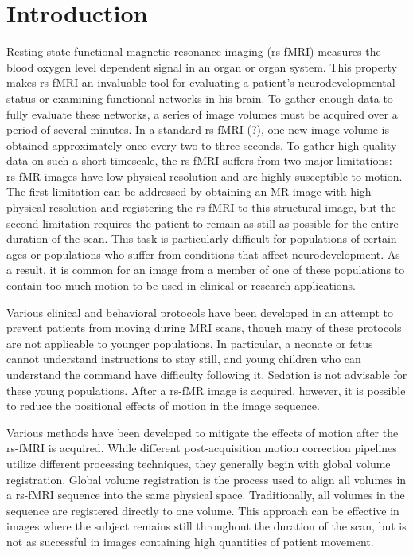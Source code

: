 \chapter{Introduction}

Resting-state functional magnetic resonance imaging (rs-fMRI) measures the blood oxygen level dependent signal in an organ or organ system. This property makes rs-fMRI an invaluable tool for evaluating a patient's neurodevelopmental status or examining functional networks in his brain. To gather enough data to fully evaluate these networks, a series of image volumes must be acquired over a period of several minutes. In a standard rs-fMRI (?), one new image volume is obtained approximately once every two to three seconds. To gather high quality data on such a short timescale, the rs-fMRI suffers from two major limitations: rs-fMR images have low physical resolution and are highly susceptible to motion. The first limitation can be addressed by obtaining an MR image with high physical resolution and registering the rs-fMRI to this structural image, but the second limitation requires the patient to remain as still as possible for the entire duration of the scan. This task is particularly difficult for populations of certain ages or populations who suffer from conditions that affect neurodevelopment. As a result, it is common for an image from a member of one of these populations to contain too much motion to be used in clinical or research applications.

Various clinical and behavioral protocols have been developed in an attempt to prevent patients from moving during MRI scans, though many of these protocols are not applicable to younger populations. In particular, a neonate or fetus cannot understand instructions to stay still, and young children who can understand the command have difficulty following it. Sedation is not advisable for these young populations. After a rs-fMR image is acquired, however, it is possible to reduce the positional effects of motion in the image sequence.

Various methods have been developed to mitigate the effects of motion after the rs-fMRI is acquired. While different post-acquisition motion correction pipelines utilize different processing techniques, they generally begin with global volume registration. Global volume registration is the process used to align all volumes in a rs-fMRI sequence into the same physical space. Traditionally, all volumes in the sequence are registered directly to one volume. This approach can be effective in images where the subject remains still throughout the duration of the scan, but is not as successful in images containing high quantities of patient movement.

